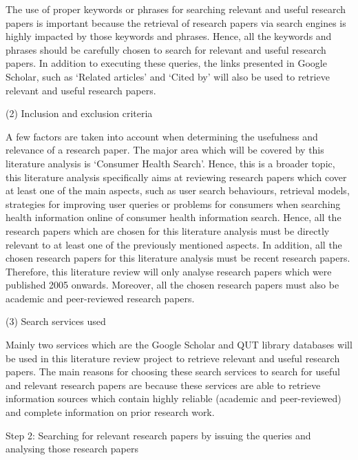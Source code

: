 \documentclass[]{article}
\begin{document}
The use of proper keywords or phrases for searching relevant and useful research papers is important because the retrieval of research papers via search engines is highly impacted by those keywords and phrases. Hence, all the keywords and phrases should be carefully chosen to search for relevant and useful research papers. In addition to executing these queries, the links presented in Google Scholar, such as ‘Related articles’ and ‘Cited by’ will also be used to retrieve relevant and useful research papers.   

(2)	Inclusion and exclusion criteria 

A few factors are taken into account when determining the usefulness and relevance of a research paper. The major area which will be covered by this literature analysis is ‘Consumer Health Search’. Hence, this is a broader topic, this literature analysis specifically aims at reviewing research papers which cover at least one of the main aspects, such as user search behaviours, retrieval models, strategies for improving user queries or problems for consumers when searching health information online of consumer health information search. Hence, all the research papers which are chosen for this literature analysis must be directly relevant to at least one of the previously mentioned aspects. In addition, all the chosen research papers for this literature analysis must be recent research papers. Therefore, this literature review will only analyse research papers which were published 2005 onwards. Moreover, all the chosen research papers must also be academic and peer-reviewed research papers. 

(3)	Search services used

Mainly two services which are the Google Scholar and QUT library databases will be used in this literature review project to retrieve relevant and useful research papers. The main reasons for choosing these search services to search for useful and relevant research papers are because these services are able to retrieve information sources which contain highly reliable (academic and peer-reviewed) and complete information on prior research work.   

Step 2: Searching for relevant research papers by issuing the queries and analysing those research papers  
\end{document}
